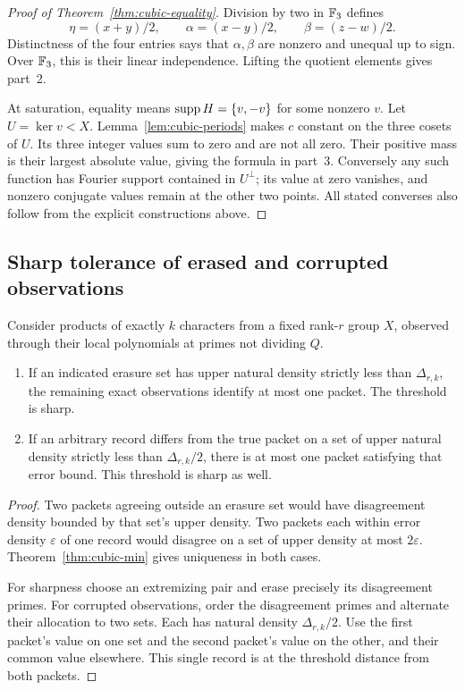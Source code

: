 \begin{proof}[Proof of Theorem~\ref{thm:cubic-equality}]
Division by two in $\mathbb F_3$ defines
\[
 \eta=(x+y)/2,\qquad\alpha=(x-y)/2,\qquad\beta=(z-w)/2.
\]
Distinctness of the four entries says that $\alpha,\beta$ are nonzero
and unequal up to sign. Over $\mathbb F_3$, this is their linear independence.
Lifting the quotient elements gives part~2.

At saturation, equality means $\operatorname{supp} H=\{v,-v\}$ for some nonzero
$v$. Let $U=\ker v<X$. Lemma~\ref{lem:cubic-periods} makes $c$
constant on the three cosets of $U$. Its three integer values sum to
zero and are not all zero. Their positive mass is their largest
absolute value, giving the formula in part~3. Conversely any such
function has Fourier support contained in $U^\perp$; its value at
zero vanishes, and nonzero conjugate values remain at the other two
points. All stated converses also follow from the explicit
constructions above.
\end{proof}

\subsection{Sharp tolerance of erased and corrupted observations}

\begin{corollary}
\label{cor:cubic-errors}
Consider products of exactly $k$ characters from a fixed rank-$r$ group
$X$, observed through their local polynomials at primes not dividing $Q$.
\begin{enumerate}
\item If an indicated erasure set has upper natural density strictly less
than $\Delta_{r,k}$, the remaining exact observations identify at most one
packet. The threshold is sharp.
\item If an arbitrary record differs from the true packet on a set of upper
natural density strictly less than $\Delta_{r,k}/2$, there is at most one
packet satisfying that error bound. This threshold is sharp as well.
\end{enumerate}
\end{corollary}

\begin{proof}
Two packets agreeing outside an erasure set would have disagreement
density bounded by that set's upper density. Two packets each within
error density $\varepsilon$ of one record would disagree on a set of
upper density at most $2\varepsilon$. Theorem~\ref{thm:cubic-min} gives
uniqueness in both cases.

For sharpness choose an extremizing pair and erase precisely its
disagreement primes. For corrupted observations, order the disagreement
primes and alternate their allocation to two sets. Each has natural
density $\Delta_{r,k}/2$. Use the first packet's value on one set and
the second packet's value on the other, and their common value elsewhere.
This single record is at the threshold distance from both packets.
\end{proof}

